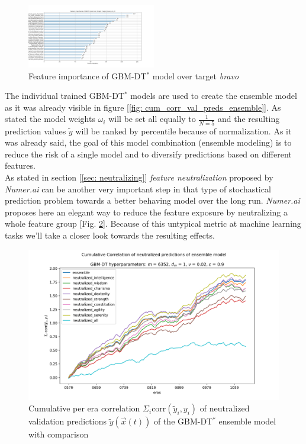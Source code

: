 \documentclass[12pt, a4paper]{article}
\begin{document}
\begin{figure}[!htpb]
    \centering
    \includegraphics[width=0.5\textwidth,trim={0 0 0 0},clip]{rounds/2024-01-17_round1_feature_importance_target_bravo_v4_20.png}
    \caption[Feature importance of model bravo]{Feature importance of GBM-DT$^{\ast}$ model over target \textit{bravo}}
    \label{fig: fi_bravo}
\end{figure}
The individual trained GBM-DT$^{\ast}$ models are used to create the ensemble model as it was already visible in figure [\ref{fig: cum_corr_val_preds_ensemble}]. As stated the model weights $\omega_i$ will be set all equally to $\frac{1}{N=5}$ and the resulting prediction values $\tilde{y}$ will be ranked by percentile because of normalization. As it was already said, the goal of this model combination (ensemble modeling) is to reduce the risk of a single model and to diversify predictions based on different features. \\
As stated in section [\ref{sec: neutralizing}] \textit{feature neutralization} proposed by \textit{Numer.ai} can be another very important step in that type of stochastical prediction problem towards a better behaving model over the long run. \textit{Numer.ai} proposes here an elegant way to reduce the feature exposure by neutralizing a whole feature group [Fig. \ref{fig: cum_corr_val_preds_ensemble_neutral}]. Because of this untypical metric at machine learning tasks we'll take a closer look towards the resulting effects. \\
\begin{figure}[!htpb]
    \centering
    \includegraphics[width=1\textwidth,trim={0 0 0 0},clip]{rounds/2024-01-17_round1_cumulative_correlation_of_validation_predicitions_neutralization_ensemble.png}
    \caption[Cumulative per era correlation of neutralized predictions of the GBM-DT$^{\ast}$ ensemble model with comparison]{Cumulative per era correlation $\Sigma_i \text{corr}(\tilde{y}_i,y_i)$ of neutralized validation predictions $\tilde{y}(\vec{x}(t))$ of the GBM-DT$^{\ast}$ ensemble model with comparison}
    \label{fig: cum_corr_val_preds_ensemble_neutral}
\end{figure}
\end{document}
